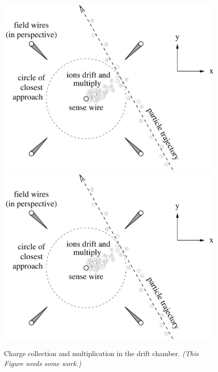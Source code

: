 \documentclass{cornell}
\begin{document}
\begin{figure}[p]
  \begin{center}
    \includegraphics[width=0.65\linewidth]{plots/driftcell}
    \includegraphics[width=0.6\linewidth]{plots/driftcell}
  \end{center}
  \caption{\label{driftcell} Charge collection and multiplication in
  the drift chamber.  {\it (This Figure needs some work.)}}
\end{figure}
\end{document}
